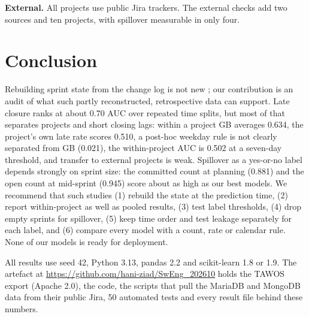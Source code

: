 \documentclass[conference]{IEEEtran}
\begin{document}
\textbf{External.} All projects use public Jira trackers. The external checks add two sources and ten projects, with spillover measurable in only four.

\balance

\section{Conclusion}

Rebuilding sprint state from the change log is not new \cite{r19}; our contribution is an audit of what such partly reconstructed, retrospective data can support. Late closure ranks at about 0.70 AUC over repeated time splits, but most of that separates projects and short closing lags: within a project GB averages 0.634, the project's own late rate scores 0.510, a post-hoc weekday rule is not clearly separated from GB (0.021), the within-project AUC is 0.502 at a seven-day threshold, and transfer to external projects is weak. Spillover as a yes-or-no label depends strongly on sprint size: the committed count at planning (0.881) and the open count at mid-sprint (0.945) score about as high as our best models. We recommend that such studies (1) rebuild the state at the prediction time, (2) report within-project as well as pooled results, (3) test label thresholds, (4) drop empty sprints for spillover, (5) keep time order and test leakage separately for each label, and (6) compare every model with a count, rate or calendar rule. None of our models is ready for deployment.

All results use seed 42, Python 3.13, pandas 2.2 and scikit-learn 1.8 or 1.9. The artefact at \url{https://github.com/hani-ziad/SwEng_202610} holds the TAWOS export (Apache 2.0), the code, the scripts that pull the MariaDB and MongoDB data from their public Jira, 50 automated tests and every result file behind these numbers.
\end{document}
